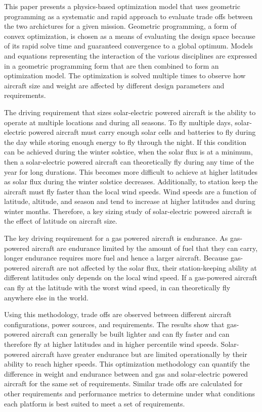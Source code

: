 This paper presents a physics-based optimization model that uses geometric programming as a systematic and rapid approach to evaluate trade offs between the two archictures for a given mission.  Geometric programming, a form of convex optimization, is chosen as a means of evaluating the design space because of its rapid solve time and guaranteed convergence to a global optimum.\cite{gp}
Models and equations representing the interaction of the various disciplines are expressed in a geometric programming form that are then combined to form an optimization model. 
The optimization is solved multiple times to observe how aircraft size and weight are affected by different design parameters and requirements. 

The driving requirement that sizes solar-electric powered aircraft is the ability to operate at multiple locations and during all seasons.  
To fly multiple days, solar-electric powered aircraft must carry enough solar cells and batteries to fly during the day while storing enough energy to fly through the night.\cite{solartech}
If this condition can be achieved during the winter solstice, when the solar flux is at a minimum, then a solar-electric powered aircraft can theoretically fly during any time of the year for long durations. \cite{solartech}
This becomes more difficult to achieve at higher latitudes as solar flux during the winter solstice decreases.  
Additionally, to station keep the aircraft must fly faster than the local wind speeds.  
Wind speeds are a function of latitude, altitude, and season and tend to increase at higher latitudes and during winter months. 
Therefore, a key sizing study of solar-electric powered aircraft is the effect of latitude on aircraft size.  

The key driving requirement for a gas powered aircraft is endurance.  
As gas-powered aircraft are endurance limited by the amount of fuel that they can carry, longer endurance requires more fuel and hence a larger aircraft.  
Because gas-powered aircraft are not affected by the solar flux, their station-keeping ability at different latitudes only depends on the local wind speed. 
If a gas-powered aircraft can fly at the latitude with the worst wind speed, in can theoretically fly anywhere else in the world.  

Using this methodology, trade offs are observed between different aircraft configurations, power sources, and requirements.  
The results show that gas-powered aircraft can generally be built lighter and can fly faster and can therefore fly at higher latitudes and in higher percentile wind speeds.  
Solar-powered aircraft have greater endurance but are limited operationally by their ability to reach higher speeds.  
This optimization methodology can quantify the difference in weight and endurance between and gas and solar-electric powered aircraft for the same set of requirements. 
Similar trade offs are calculated for other requirements and performance metrics to determine under what conditions each platform is best suited to meet a set of requirements.


